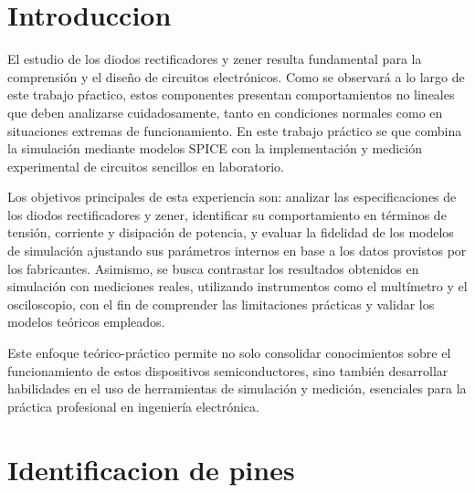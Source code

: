 \documentclass[chaptersright]{informeutn}
\begin{document}
\maketitle
\tableofcontents

\chapter{Introduccion}

  El estudio de los diodos rectificadores y zener resulta fundamental para la comprensión y el diseño de circuitos
  electrónicos. Como se observará a lo largo de este trabajo pŕactico, estos componentes presentan comportamientos
  no lineales que deben analizarse
  cuidadosamente, tanto en condiciones normales como en situaciones extremas de funcionamiento. En este trabajo
  práctico se que combina la simulación mediante modelos SPICE con la implementación y medición experimental de
  circuitos sencillos en laboratorio.
    
  Los objetivos principales de esta experiencia son: analizar las especificaciones de los diodos rectificadores y zener,
  identificar su comportamiento en términos de tensión, corriente y disipación de potencia, y evaluar la fidelidad de
  los modelos de simulación ajustando sus parámetros internos en base a los datos provistos por los fabricantes.
  Asimismo, se busca contrastar los resultados obtenidos en simulación con mediciones reales, utilizando instrumentos
  como el multímetro y el osciloscopio, con el fin de comprender las limitaciones prácticas y validar los modelos
  teóricos empleados.

  Este enfoque teórico-práctico permite no solo consolidar conocimientos sobre el funcionamiento de estos dispositivos
  semiconductores, sino también desarrollar habilidades en el uso de herramientas de simulación y medición, esenciales
  para la práctica profesional en ingeniería electrónica.
  
\chapter{Identificacion de pines}
\end{document}
